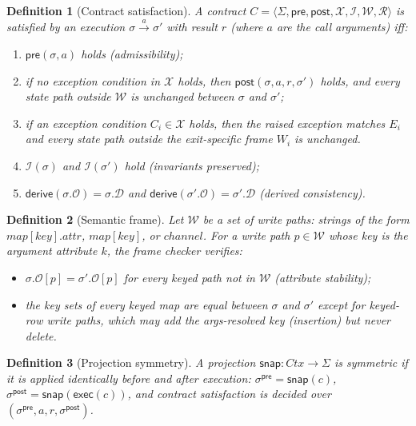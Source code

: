 \documentclass[11pt,a4paper]{article}
\newtheorem{definition}{Definition}
\begin{document}
\begin{definition}[Contract satisfaction]
A contract $C = \langle \Sigma, \mathsf{pre}, \mathsf{post}, \mathcal{X},
\mathcal{I}, \mathcal{W}, \mathcal{R} \rangle$ is \emph{satisfied} by
an execution $\sigma \xrightarrow{a} \sigma'$ with result $r$ (where
$a$ are the call arguments) iff:
\begin{enumerate}[label=(\roman*),nosep]
\item $\mathsf{pre}(\sigma, a)$ holds (admissibility);
\item if no exception condition in $\mathcal{X}$ holds, then
  $\mathsf{post}(\sigma, a, r, \sigma')$ holds, and every state path
  outside $\mathcal{W}$ is unchanged between $\sigma$ and $\sigma'$;
\item if an exception condition $C_i \in \mathcal{X}$ holds, then the
  raised exception matches $E_i$ and every state path outside the
  exit-specific frame $W_i$ is unchanged.
\item $\mathcal{I}(\sigma)$ and $\mathcal{I}(\sigma')$ hold
  (invariants preserved);
\item $\mathsf{derive}(\sigma.\mathcal{O}) = \sigma.\mathcal{D}$ and
  $\mathsf{derive}(\sigma'.\mathcal{O}) = \sigma'.\mathcal{D}$
  (derived consistency).
\end{enumerate}
\end{definition}

\begin{definition}[Semantic frame]
Let $\mathcal{W}$ be a set of \emph{write paths}: strings of the form
$\mathit{map}[key].\mathit{attr}$, $\mathit{map}[key]$, or
$\mathit{channel}$.  For a write path $p \in \mathcal{W}$ whose key
is the argument attribute $k$, the frame checker verifies:
\begin{itemize}[nosep]
\item $\sigma.\mathcal{O}[p] = \sigma'.\mathcal{O}[p]$ for every
  keyed path not in $\mathcal{W}$ (attribute stability);
\item the key sets of every keyed map are equal between $\sigma$ and
  $\sigma'$ except for keyed-row write paths, which may add the
  args-resolved key (insertion) but never delete.
\end{itemize}
\end{definition}

\begin{definition}[Projection symmetry]
A projection $\mathsf{snap}: \mathit{Ctx} \to \Sigma$ is
\emph{symmetric} if it is applied identically before and after
execution: $\sigma^{\mathsf{pre}} = \mathsf{snap}(c)$,
$\sigma^{\mathsf{post}} = \mathsf{snap}(\mathsf{exec}(c))$, and
contract satisfaction is decided over
$(\sigma^{\mathsf{pre}}, a, r, \sigma^{\mathsf{post}})$.
\end{definition}
\end{document}
